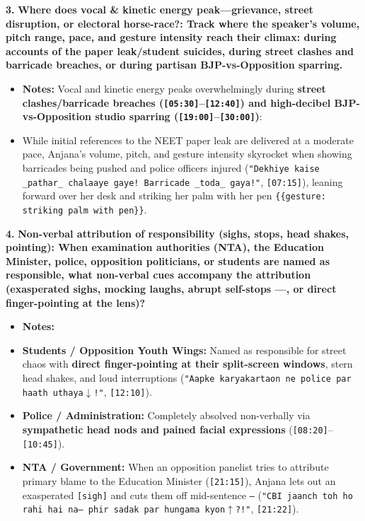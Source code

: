 \documentclass[10pt,a4paper]{article}
\begin{document}
\noindent\textbf{3.} \textbf{Where does vocal \& kinetic energy peak---grievance, street disruption, or electoral horse-race?: Track where the speaker's volume, pitch range, pace, and gesture intensity reach their climax: during accounts of the paper leak/student suicides, during street clashes and barricade breaches, or during partisan BJP-vs-Opposition sparring.}\par\smallskip
\begin{itemize}
  \item \textbf{Notes:}
Vocal and kinetic energy peaks overwhelmingly during \textbf{street clashes/barricade breaches (\texttt{[05:30]}--\texttt{[12:40]}) and high-decibel BJP-vs-Opposition studio sparring (\texttt{[19:00]}--\texttt{[30:00]})}:\par\smallskip
  \item While initial references to the NEET paper leak are delivered at a moderate pace, Anjana's volume, pitch, and gesture intensity skyrocket when showing barricades being pushed and police officers injured (\texttt{"Dekhiye kaise \_pathar\_ chalaaye gaye! Barricade \_toda\_ gaya!"}, \texttt{[07:15]}), leaning forward over her desk and striking her palm with her pen \texttt{\{\{gesture: striking palm with pen\}\}}.
\end{itemize}

\noindent\textbf{4.} \textbf{Non-verbal attribution of responsibility (sighs, stops, head shakes, pointing): When examination authorities (NTA), the Education Minister, police, opposition politicians, or students are named as responsible, what non-verbal cues accompany the attribution (exasperated sighs, mocking laughs, abrupt self-stops ---, or direct finger-pointing at the lens)?}\par\smallskip
\begin{itemize}
  \item \textbf{Notes:}
  \item \textbf{Students / Opposition Youth Wings:} Named as responsible for street chaos with \textbf{direct finger-pointing at their split-screen windows}, stern head shakes, and loud interruptions (\texttt{"Aapke karyakartaon ne police par haath uthaya$\downarrow$!"}, \texttt{[12:10]}).
  \item \textbf{Police / Administration:} Completely absolved non-verbally via \textbf{sympathetic head nods and pained facial expressions} (\texttt{[08:20]}--\texttt{[10:45]}).
  \item \textbf{NTA / Government:} When an opposition panelist tries to attribute primary blame to the Education Minister (\texttt{[21:15]}), Anjana lets out an exasperated \texttt{[sigh]} and cuts them off mid-sentence \texttt{---} (\texttt{"CBI jaanch toh ho rahi hai na--- phir sadak par hungama kyon$\uparrow$?!"}, \texttt{[21:22]}).
\end{itemize}
\end{document}

